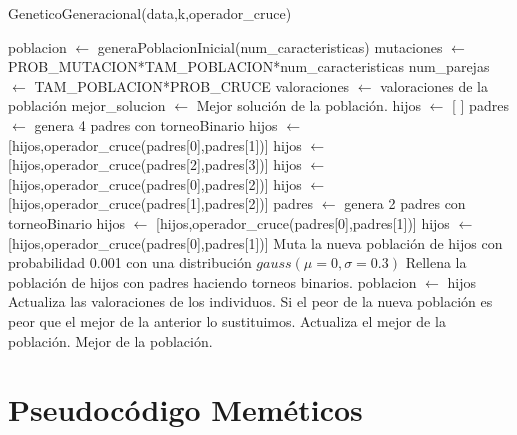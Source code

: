 \documentclass[12pt,a4paper]{article}
\begin{document}
	\begin{algorithm}
		\caption{GeneticoGeneracional(data,k,operador\_cruce)}
		\begin{algorithmic}
			\STATE poblacion $\leftarrow$ generaPoblacionInicial(num\_caracteristicas)
			\STATE mutaciones $\leftarrow$ PROB\_MUTACION*TAM\_POBLACION*num\_caracteristicas
			\STATE num\_parejas $\leftarrow$ TAM\_POBLACION*PROB\_CRUCE
			\STATE valoraciones $\leftarrow$ valoraciones de la población
			\STATE mejor\_solucion $\leftarrow$ Mejor solución de la población.
				\STATE hijos $\leftarrow$ [ ]
						\STATE padres $\leftarrow$ genera 4 padres con torneoBinario
						\STATE hijos $\leftarrow$ [hijos,operador\_cruce(padres[0],padres[1])]
						\STATE hijos $\leftarrow$ [hijos,operador\_cruce(padres[2],padres[3])]
						\STATE hijos $\leftarrow$ [hijos,operador\_cruce(padres[0],padres[2])]
						\STATE hijos $\leftarrow$ [hijos,operador\_cruce(padres[1],padres[2])]
					\ELSE
						\STATE padres $\leftarrow$ genera 2 padres con torneoBinario
						\STATE hijos $\leftarrow$ [hijos,operador\_cruce(padres[0],padres[1])]
						\STATE hijos $\leftarrow$ [hijos,operador\_cruce(padres[0],padres[1])]
					\ENDIF
				\ENDFOR
				\STATE Muta la nueva población de hijos con probabilidad 0.001 con una distribución $gauss(\mu=0,\sigma=0.3)$
				\STATE Rellena la población de hijos con padres haciendo torneos binarios.
				\STATE poblacion $\leftarrow$ hijos
				\STATE Actualiza las valoraciones de los individuos.
				\STATE Si el peor de la nueva población es peor que el mejor de la anterior lo sustituimos.
				\STATE Actualiza el mejor de la población.
			\ENDWHILE
			\RETURN Mejor de la población.
		\end{algorithmic}
	\end{algorithm}

	\newpage

	\section{Pseudocódigo Meméticos}
	\label{sec:memeticos}
\end{document}
